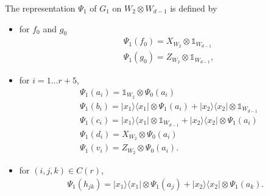 \documentclass[11pt,letterpaper]{article}
\newcommand{\ketbra}[2]{|#1\rangle\langle#2|}
\newcommand{\x}{\otimes}
\newcommand{\1}{\mathbb{1}}
\theoremstyle{definition}
\begin{document}
The representation $\Psi_1$ of $G_1$ on $W_2 \x W_{d-1}$ is defined by
\begin{itemize}
\item for $f_0$ and $g_0$
\begin{align}
	&\Psi_1(f_0) = X_{W_2} \x \1_{W_{d-1}} \\
	&\Psi_1(g_0) = Z_{W_2} \x \1_{W_{d-1}},
\end{align}
\item
for $i = 1 \dots r+5$,
\begin{align}
	&\Psi_1(a_i) = \1_{W_2} \x \Psi_0(a_i) \\
	&\Psi_1(b_i) = \ketbra{x_1}{x_1} \x \Psi_1(a_i) + \ketbra{x_2}{x_2} \x \1_{W_{d-1}} \\
	&\Psi_1(c_i) =\ketbra{x_1}{x_1} \x \1_{W_{d-1}} + \ketbra{x_2}{x_2} \x \Psi_1(a_i) \\
	&\Psi_1(d_i) =  X_{W_2} \x \Psi_0(a_i)\\
	&\Psi_1(v_i) = Z_{W_2} \x \Psi_0(a_i).
\end{align}
\item for $(i,j,k) \in C(r)$,
\begin{align}
	\Psi_1(h_{jk}) = \ketbra{x_1}{x_1} \x \Psi_1(a_j) + \ketbra{x_2}{x_2} \x \Psi_1(a_k).
\end{align}
\end{itemize}
\end{document}
